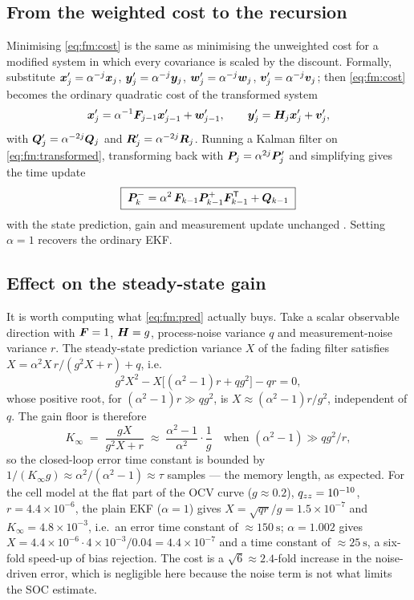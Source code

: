 \subsection{From the weighted cost to the recursion}
Minimising \eqref{eq:fm:cost} is the same as minimising the unweighted cost for a modified system in
which every covariance is scaled by the discount.  Formally, substitute
$\bm{x}'_j = \alpha^{-j}\bm{x}_j$, $\bm{y}'_j=\alpha^{-j}\bm{y}_j$, $\bm{w}'_j=\alpha^{-j}\bm{w}_j$,
$\bm{v}'_j=\alpha^{-j}\bm{v}_j$; then \eqref{eq:fm:cost} becomes the ordinary quadratic cost of the
transformed system
\begin{equation}
\bm{x}'_{j} = \alpha^{-1}\bm{F}_{j-1}\bm{x}'_{j-1} + \bm{w}'_{j-1},\qquad
\bm{y}'_j = \bm{H}_j\bm{x}'_j+\bm{v}'_j ,
\label{eq:fm:transformed}
\end{equation}
with $\bm{Q}'_j=\alpha^{-2j}\bm{Q}_j$ and $\bm{R}'_j=\alpha^{-2j}\bm{R}_j$.  Running a Kalman filter on
\eqref{eq:fm:transformed}, transforming back with $\bm{P}_j = \alpha^{2j}\bm{P}'_j$ and simplifying gives
the time update
\begin{equation}
\boxed{\;\bm{P}^{-}_k = \alpha^2\,\bm{F}_{k-1}\bm{P}^{+}_{k-1}\bm{F}_{k-1}^{\mathsf{T}} + \bm{Q}_{k-1}\;}
\label{eq:fm:pred}
\end{equation}
with the state prediction, gain and measurement update unchanged
\cite{sorenson1971fading}\cite[Sec.~7.4]{simon2006}.  Setting $\alpha=1$ recovers the ordinary EKF.

\subsection{Effect on the steady-state gain}
It is worth computing what \eqref{eq:fm:pred} actually buys.  Take a scalar observable direction with
$\bm{F}=1$, $\bm{H}=g$, process-noise variance $q$ and measurement-noise variance $r$.  The steady-state
prediction variance $X$ of the fading filter satisfies
$X = \alpha^2 X\,r/(g^2X+r) + q$, i.e.
\begin{equation}
g^2X^2 - X\big[(\alpha^2-1)r + q g^2\big] - qr = 0 ,
\label{eq:fm:fix}
\end{equation}
whose positive root, for $(\alpha^2-1)r \gg qg^2$, is $X \approx (\alpha^2-1)r/g^2$, independent of
$q$.  The gain floor is therefore
\begin{equation}
K_\infty \;=\; \frac{gX}{g^2X+r} \;\approx\; \frac{\alpha^2-1}{\alpha^2}\cdot\frac{1}{g}
\quad\text{when } (\alpha^2-1)\gg qg^2/r ,
\label{eq:fm:gainfloor}
\end{equation}
so the closed-loop error time constant is bounded by $1/(K_\infty g)\approx \alpha^2/(\alpha^2-1)
\approx \tau$ samples --- the memory length, as expected.  For the cell model at the flat part of
the OCV curve ($g\approx0.2$), $q_{zz}=10^{-10}$, $r=4.4\times10^{-6}$, the plain EKF
($\alpha=1$) gives $X = \sqrt{qr}/g = 1.5\times10^{-7}$ and $K_\infty=4.8\times10^{-3}$, i.e.\ an
error time constant of $\approx\SI{150}{\second}$; $\alpha=1.002$ gives
$X=4.4\times10^{-6}\cdot 4\times10^{-3}/0.04 = 4.4\times10^{-7}$ and a time constant of
$\approx\SI{25}{\second}$, a six-fold speed-up of bias rejection.  The cost is a
$\sqrt{6}\approx2.4$-fold increase in the noise-driven error, which is negligible here because the
noise term is not what limits the SOC estimate.

